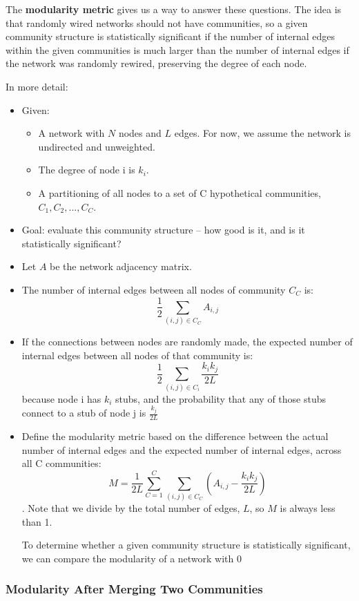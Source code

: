 \documentclass[11pt]{scrartcl} %
\begin{document}
The \textbf{modularity metric} gives us a way to answer these questions. The idea is that randomly wired networks should not have communities, so a given community structure is statistically significant if the number of internal edges within the given communities is much larger than the number of internal edges if the network was randomly rewired, preserving the degree of each node.

In more detail:
\begin{itemize}
	\item Given:

		\begin{itemize}
 			\item A network with $N$ nodes and $L$ edges. For now, we assume the network is undirected and unweighted.
			\item The degree of node i is $k_i$.
			\item A partitioning of all nodes to a set of C hypothetical communities, $C_1, C_2, ... , C_C$.
		\end{itemize} 
	\item Goal: evaluate this community structure -- how good is it, and is it statistically significant?
	\item Let $A$ be the network adjacency matrix. 
	\item The number of internal edges between all nodes of community $C_C$ is: \[ \frac{1}{2} \sum_{(i,j)\in C_C} A_{i,j} \]
	\item If the connections between nodes are randomly made, the expected number of internal edges between all nodes of that community is: \[ \frac{1}{2} \sum_{(i,j)\in C_i} \frac{k_i k_j}{2L} \] because node i has $k_i$ stubs, and the probability that any of those stubs connect to a stub of node j is $\frac{k_j}{2L}$
	\item Define the modularity metric based on the difference between the actual number of internal edges and the expected number of internal edges, across all C communities: \[ M = \frac{1}{2L} \sum_{C=1}^{C} \sum_{(i,j)\in C_C} (A_{i,j} - \frac{k_i k_j}{2L}) \]. Note that we divide by the total number of edges, $L$, so $M$ is always less than 1.

To determine whether a given community structure is statistically significant, we can compare the modularity of a network with 0

\end{itemize} 


\subsubsection{Modularity After Merging Two Communities}
\end{document}
